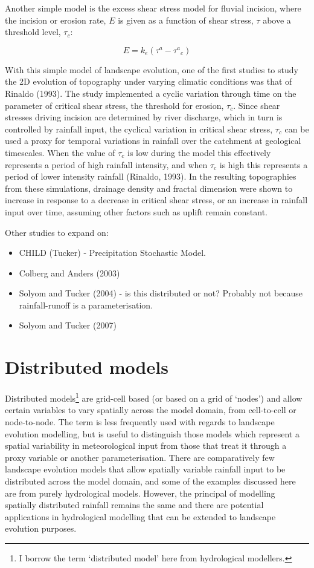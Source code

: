 Another simple model is the excess shear stress model for fluvial incision, where the incision or erosion rate, \(E\) is given as a function of shear stress, \(\tau\) above a threshold level, \(\tau_c\):

\begin{equation}
E = k_e(\tau^a -  {\tau^a}_c)
\end{equation}

With this simple model of landscape evolution, one of the first studies to study the 2D evolution of topography under varying climatic conditions was that of Rinaldo (1993). The study implemented a cyclic variation through time on the parameter of critical shear stress, the threshold for erosion, \(\tau_c\). Since shear stresses driving incision are determined by river discharge, which in turn is controlled by rainfall input, the cyclical variation in critical shear stress, \(\tau_c\) can be used a proxy for temporal variations in rainfall over the catchment at geological timescales. When the value of \(\tau_c\) is low during the model this effectively represents a period of high rainfall intensity, and when \(\tau_c\) is high this represents a period of lower intensity rainfall (Rinaldo, 1993). In the resulting topographies from these simulations, drainage density and fractal dimension were shown to increase in response to a decrease in critical shear stress, or an increase in rainfall input over time, assuming other factors such as uplift remain constant.

Other studies to expand on:
\begin{itemize}
\item CHILD (Tucker) - Precipitation Stochastic Model.
\item Colberg and Anders (2003)
\item Solyom and Tucker (2004) - is this distributed or not? Probably not because rainfall-runoff is a parameterisation.
\item Solyom and Tucker (2007)
\end{itemize}

\section{Distributed models}
Distributed models\footnote{I borrow the term `distributed model' here from hydrological modellers.} are grid-cell based (or based on a grid of `nodes') and allow certain variables to vary spatially across the model domain, from cell-to-cell or node-to-node. The term is less frequently used with regards to landscape evolution modelling, but is useful to distinguish those models which represent a spatial variability in meteorological input from those that treat it through a proxy variable or another parameterisation. There are comparatively few landscape evolution models that allow spatially variable rainfall input to be distributed across the model domain, and some of the examples discussed here are from purely hydrological models. However, the principal of modelling spatially distributed rainfall remains the same and there are potential applications in hydrological modelling that can be extended to landscape evolution purposes. 

